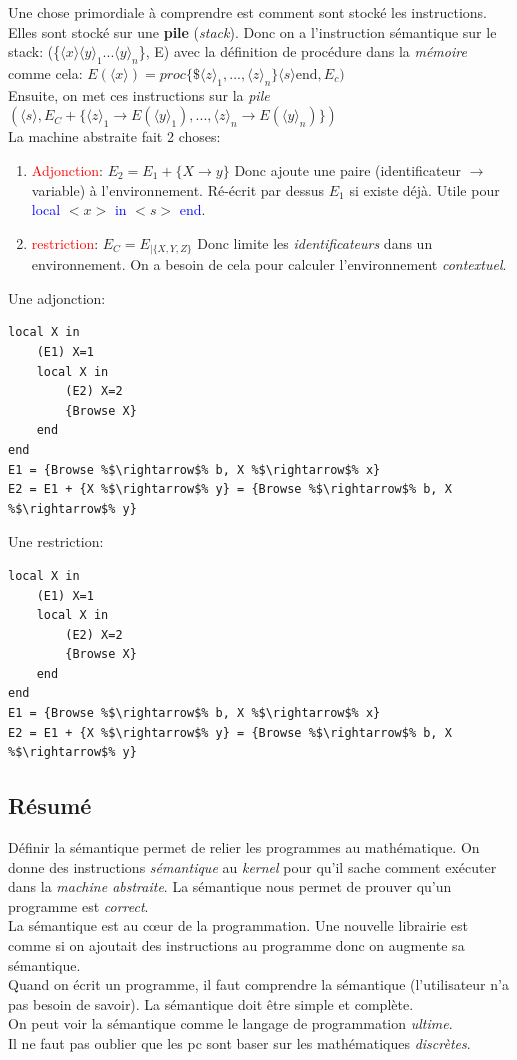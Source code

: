 \documentclass{report}
\begin{document}
Une chose primordiale à comprendre est comment sont stocké les instructions. Elles sont stocké sur une \textbf{pile} (\textit{stack}). Donc on a l'instruction sémantique sur le stack: (\{$\langle x \rangle \langle y \rangle_1 ... \langle y \rangle_n$\}, E) avec la définition de procédure dans la \textit{mémoire} comme cela: $E(\langle x \rangle) = proc\{\$ \langle z \rangle_1, ..., \langle z \rangle_n\} \langle s \rangle \text{end}, E_c)$ \\
Ensuite, on met ces instructions sur la \textit{pile} $(\langle s \rangle , E_C + \{\langle z \rangle_1 \rightarrow E(\langle y \rangle_1), ..., \langle z \rangle_n \rightarrow E(\langle y \rangle_n)\})$\\

La machine abstraite fait 2 choses:
\begin{enumerate}
\item \textcolor{red}{Adjonction}: $E_2 = E_1+\{X \rightarrow y\}$ Donc ajoute une paire (identificateur $\rightarrow$ variable) à l'environnement. Ré-écrit par dessus $E_1$ si existe déjà. Utile pour \textcolor{blue}{local} $<x>$ \textcolor{blue}{in} $<s>$ \textcolor{blue}{end}.
\item \textcolor{red}{restriction}: $E_C = E_{|\{X,Y,Z\}}$ Donc limite les \textit{identificateurs} dans un environnement. On a besoin de cela pour calculer l'environnement \textit{contextuel}.
\end{enumerate}
Une adjonction:
\begin{lstlisting}[escapechar=\%]
local X in
	(E1) X=1 
	local X in 
		(E2) X=2 
		{Browse X}
	end 
end
E1 = {Browse %$\rightarrow$% b, X %$\rightarrow$% x}
E2 = E1 + {X %$\rightarrow$% y} = {Browse %$\rightarrow$% b, X %$\rightarrow$% y}
\end{lstlisting}
Une restriction:
\begin{lstlisting}[escapechar=\%]
local X in 
	(E1) X=1	
	local X in 
		(E2) X=2
		{Browse X}
	end
end
E1 = {Browse %$\rightarrow$% b, X %$\rightarrow$% x}
E2 = E1 + {X %$\rightarrow$% y} = {Browse %$\rightarrow$% b, X %$\rightarrow$% y}
\end{lstlisting}
\subsection{Résumé}
Définir la sémantique permet de relier les programmes au mathématique. On donne des instructions \textit{sémantique} au \textit{kernel} pour qu'il sache comment exécuter dans la \textit{machine abstraite}. La sémantique nous permet de prouver qu'un programme est \textit{correct}.\\
La sémantique est au cœur de la programmation. Une nouvelle librairie est comme si on ajoutait des instructions au programme donc on augmente sa sémantique.\\
Quand on écrit un programme, il faut comprendre la sémantique (l'utilisateur n'a pas besoin de savoir). La sémantique doit être simple et complète.\\
On peut voir la sémantique comme le langage de programmation \textit{ultime}.\\
Il ne faut pas oublier que les pc sont baser sur les mathématiques \textit{discrètes}. 
\end{document}
